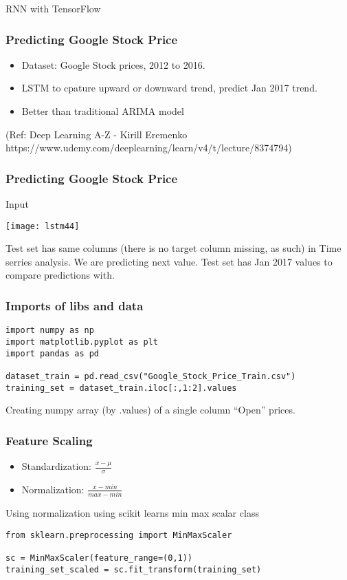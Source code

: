 \begin{frame}
  \begin{center}
    {\Large RNN with TensorFlow}
    
  \end{center}
\end{frame}


\begin{frame}[fragile] \frametitle{Predicting Google Stock Price}
\begin{itemize}
\item Dataset: Google Stock prices, 2012 to 2016.
\item LSTM to cpature upward or downward trend, predict Jan 2017 trend.
\item Better than traditional ARIMA model
\end{itemize}
(Ref: Deep Learning A-Z - Kirill Eremenko https://www.udemy.com/deeplearning/learn/v4/t/lecture/8374794)
\end{frame}



\begin{frame}[fragile] \frametitle{Predicting Google Stock Price}
Input
\begin{center}
\texttt{[image: lstm44]}
\end{center}
Test set has same columns (there is no target column missing, as such) in Time serries analysis. We are predicting next value. Test set has Jan 2017 values to compare predictions with.
\end{frame}


\begin{frame}[fragile] \frametitle{Imports of libs and data}

\begin{lstlisting}
import numpy as np
import matplotlib.pyplot as plt
import pandas as pd

dataset_train = pd.read_csv("Google_Stock_Price_Train.csv")
training_set = dataset_train.iloc[:,1:2].values
\end{lstlisting}
Creating numpy array (by .values) of a single column ``Open'' prices.
\end{frame}

\begin{frame}[fragile] \frametitle{Feature Scaling}
\begin{itemize}
\item Standardization: $\frac{x - \mu}{\sigma}$
\item Normalization: $\frac{x - min}{max - min}$
\end{itemize}
Using normalization using scikit learns min max scalar class
\begin{lstlisting}
from sklearn.preprocessing import MinMaxScaler

sc = MinMaxScaler(feature_range=(0,1))
training_set_scaled = sc.fit_transform(training_set)
\end{lstlisting}
\end{frame}


